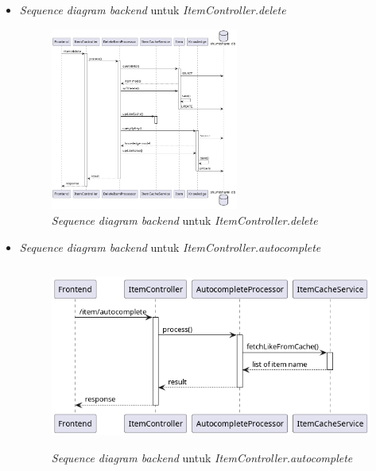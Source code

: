 \documentclass[a4paper]{article}
\begin{document}
\begin{enumerate}
\begin{enumerate}
\begin{itemize}
            \newpage
            \item \textit{Sequence diagram backend} untuk \textit{ItemController.delete}
            \begin{figure}[h]
                \centering
                \includegraphics*[height=6cm]{diagram/sequence diagram/BE/item controller/delete/delete.png}
                \caption{\textit{Sequence diagram backend} untuk \textit{ItemController.delete}}
            \end{figure}

            \item \textit{Sequence diagram backend} untuk \textit{ItemController.autocomplete}
            \begin{figure}[h]
                \centering
                \includegraphics*[height=6cm]{diagram/sequence diagram/BE/item controller/autocomplete/autocomplete.png}
                \caption{\textit{Sequence diagram backend} untuk \textit{ItemController.autocomplete}}
            \end{figure}


\end{itemize}
\end{enumerate}
\end{enumerate}
\end{document}
